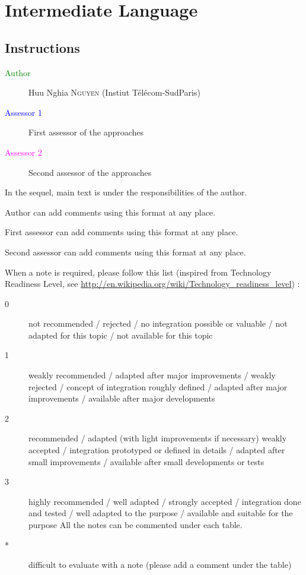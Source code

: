 \chapter{Intermediate Language}
\label{sec:if}

\section{Instructions}

\begin{description}
\item[\textcolor{green}{Author}]  Huu Nghia \textsc{Nguyen} (Instiut T\'el\'ecom-SudParis)
\item[\textcolor{blue}{Assessor 1}] First assessor of the approaches 
\item[\textcolor{magenta}{Assessor 2}] Second assessor of the approaches 
\end{description}

In the sequel, main text is under the responsibilities of the author.

\begin{author_comment}
Author can add comments using this format at any place.
\end{author_comment}

\begin{assessor1}
First assessor can add comments using this format at any place.
\end{assessor1}

\begin{assessor2}
Second assessor can add comments using this format at any place.
\end{assessor2}

When a note is required, please follow this list (inspired from Technology Readiness Level, see \url{http://en.wikipedia.org/wiki/Technology\_readiness\_level}) :

\begin{description}
\item[0] not recommended / rejected / no integration possible or valuable / not adapted for this topic / not available for this topic
\item[1] weakly recommended / adapted after major improvements / weakly rejected / concept of integration roughly defined / adapted after major improvements / available after major developments
\item[2] recommended / adapted (with light improvements if necessary)  weakly accepted / integration prototyped or defined in details / adapted after small improvements / available after small developments or tests
\item[3] highly recommended / well adapted / strongly accepted / integration done and tested / well adapted to the purpose / available and suitable for the purpose All the notes can be commented under each table.
\item[*] difficult to evaluate with a note (please add a comment under the table)
\end{description}


